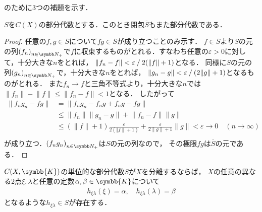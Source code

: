 \documentclass[../main.tex]{subfiles}
\begin{document}
のために3つの補題を示す．

\begin{thmbox}
\begin{lemma}
\(S\)を\(C(X)\)の部分代数とする．このとき閉包\(\overline{S}\)もまた部分代数である．
\end{lemma}
\end{thmbox}

\begin{proof}
任意の\(f, g \in \overline{S}\)について\(f g \in \overline{S}\)が成り立つことのみ示す．
\(f \in \overline{S}\)より\(S\)の元の列\({(f_n)}_{n \in \PositiveInteger}\)で\(f\)に収束するものがとれる．すなわち任意の\(\varepsilon > 0\)に対して，十分大きな\(n\)をとれば，
\(\lVert f_n - f \rVert < \varepsilon\mathbin{/}2( \lVert f \rVert + 1)\)となる．
同様に\(S\)の元の列\({(g_n)}_{n \in \PositiveInteger}\)で，十分大きな\(n\)をとれば，
\(\lVert g_n - g \rVert < \varepsilon\mathbin{/}(2 \lVert g \rVert + 1)\)となるものがとれる．
また\(f_n \to f\)と三角不等式より，十分大きな\(n\)では\(\lVert f_n \rVert - \lVert f \rVert \leq \lVert f_n - f \rVert < 1\)となる．
したがって
\begin{align*}
    \lVert f_n g_n - fg \rVert
    &= \lVert f_n g_n - f_n g + f_n g - fg \rVert \\
    &\leq \lVert f_n \rVert \lVert g_n - g \rVert + \lVert f_n - f \rVert \lVert g \rVert \\
    &\leq (\lVert f \rVert + 1) \frac{\varepsilon}{2 (\Vert f \rVert + 1)} + \frac{\varepsilon}{2 \lVert g \rVert + 1} \lVert g \rVert < \varepsilon \to 0 \quad(n \to \infty) \\
\end{align*}
が成り立つ．\({(f_n g_n)}_{n \in \PositiveInteger}\)は\(S\)の元の列なので，
その極限\(fg\)は\(\overline{S}\)の元である．
\end{proof}

\begin{thmbox}
\begin{lemma}
\(C(X, \symbb{K})\)の単位的な部分代数\(S\)が\(X\)を分離するならば，
\(X\)の任意の異なる2点\(\xi, \lambda\)と任意の定数\(\alpha, \beta \in \symbb{K}\)について
\begin{align*}
    h_{\xi\lambda}(\xi) = \alpha,\quad h_{\xi\lambda}(\lambda) = \beta
\end{align*}
となるような\(h_{\xi\lambda} \in S\)が存在する．
\end{lemma}
\end{thmbox}
\end{document}
